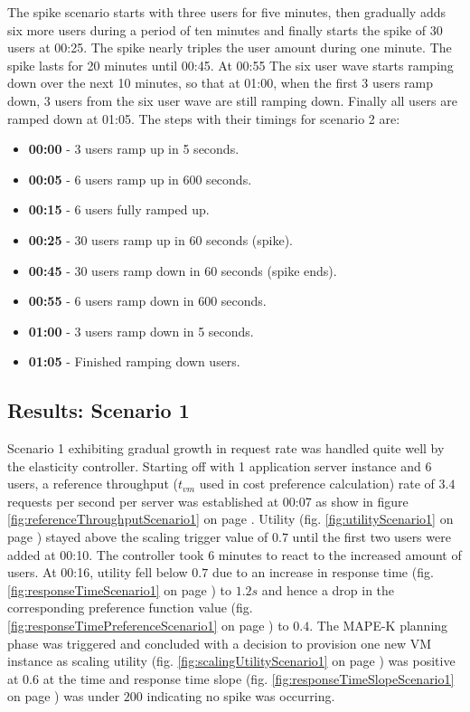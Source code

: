 \documentclass[english]{tktltiki2}
\theoremstyle{definition}
\theoremstyle{remark}
\begin{document}
The spike scenario starts with three users for five minutes, then gradually adds
six more users during a period of ten minutes and finally starts the spike of 30
users at 00:25. The spike nearly triples the user amount during one minute. The
spike lasts for 20 minutes until 00:45. At 00:55 The six user wave starts
ramping down over the next 10 minutes, so that at 01:00, when the first 3 users
ramp down, 3 users from the six user wave are still ramping down. Finally all
users are ramped down at 01:05. The steps with their timings for scenario 2 are:

\begin{itemize}
	\item{\textbf{00:00} - 3 users ramp up in 5 seconds.}
	\item{\textbf{00:05} - 6 users ramp up in 600 seconds.}
	\item{\textbf{00:15} - 6 users fully ramped up.}
	\item{\textbf{00:25} - 30 users ramp up in 60 seconds (spike).}
	\item{\textbf{00:45} - 30 users ramp down in 60 seconds (spike ends).}
	\item{\textbf{00:55} - 6 users ramp down in 600 seconds.}
	\item{\textbf{01:00} - 3 users ramp down in 5 seconds.}
	\item{\textbf{01:05} - Finished ramping down users.}	
	\label{gatlingStepsScenario2}
\end{itemize}

\subsection{Results: Scenario 1}
\label{sec:resultsScenario1}

Scenario 1 exhibiting gradual growth in request rate was handled quite well by
the elasticity controller. Starting off with 1 application server instance and 6
users, a reference throughput ($t_{vm}$ used in cost preference calculation)
rate of $3.4$ requests per second per server was established at 00:07 as show in
figure \ref{fig:referenceThroughputScenario1} on page
\pageref{fig:referenceThroughputScenario1}. Utility (fig.
\ref{fig:utilityScenario1} on page \pageref{fig:utilityScenario1}) stayed above
the scaling trigger value of $0.7$ until the first two users were added at
00:10. The controller took 6 minutes to react to the increased amount of users.
At 00:16, utility fell below $0.7$ due to an increase in response time (fig.
\ref{fig:responseTimeScenario1} on page \pageref{fig:responseTimeScenario1}) to
$1.2 s$ and hence a drop in the corresponding preference function value (fig.
\ref{fig:responseTimePreferenceScenario1} on page
\pageref{fig:responseTimePreferenceScenario1}) to $0.4$. The MAPE-K planning
phase was triggered and concluded with a decision to provision one new VM
instance as scaling utility (fig. \ref{fig:scalingUtilityScenario1} on page
\pageref{fig:scalingUtilityScenario1}) was positive at $0.6$ at the time and
response time slope (fig. \ref{fig:responseTimeSlopeScenario1} on page
\pageref{fig:responseTimeSlopeScenario1}) was under $200$ indicating no spike
was occurring.
\end{document}
